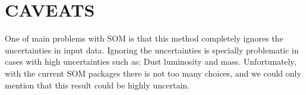  \section{CAVEATS}
 One of main problems with SOM is that this method completely ignores the uncertainties in input data.
 Ignoring the uncertainties is specially problematic in cases with high uncertainties such as: Dust luminosity and mass.
 Unfortunately, with the current SOM packages there is not too many choices, and we could only mention that this result could be highly uncertain. 
 